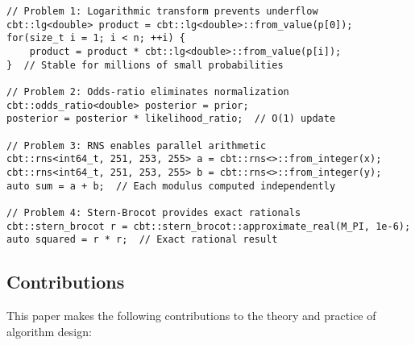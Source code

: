\documentclass[11pt]{article}
\theoremstyle{definition}
\begin{document}
\begin{lstlisting}[caption={Solutions through CBTs},label={lst:solutions}]
// Problem 1: Logarithmic transform prevents underflow
cbt::lg<double> product = cbt::lg<double>::from_value(p[0]);
for(size_t i = 1; i < n; ++i) {
    product = product * cbt::lg<double>::from_value(p[i]);
}  // Stable for millions of small probabilities

// Problem 2: Odds-ratio eliminates normalization  
cbt::odds_ratio<double> posterior = prior;
posterior = posterior * likelihood_ratio;  // O(1) update

// Problem 3: RNS enables parallel arithmetic
cbt::rns<int64_t, 251, 253, 255> a = cbt::rns<>::from_integer(x);
cbt::rns<int64_t, 251, 253, 255> b = cbt::rns<>::from_integer(y);
auto sum = a + b;  // Each modulus computed independently

// Problem 4: Stern-Brocot provides exact rationals
cbt::stern_brocot r = cbt::stern_brocot::approximate_real(M_PI, 1e-6);
auto squared = r * r;  // Exact rational result
\end{lstlisting}

\subsection{Contributions}

This paper makes the following contributions to the theory and practice of algorithm design:
\end{document}
